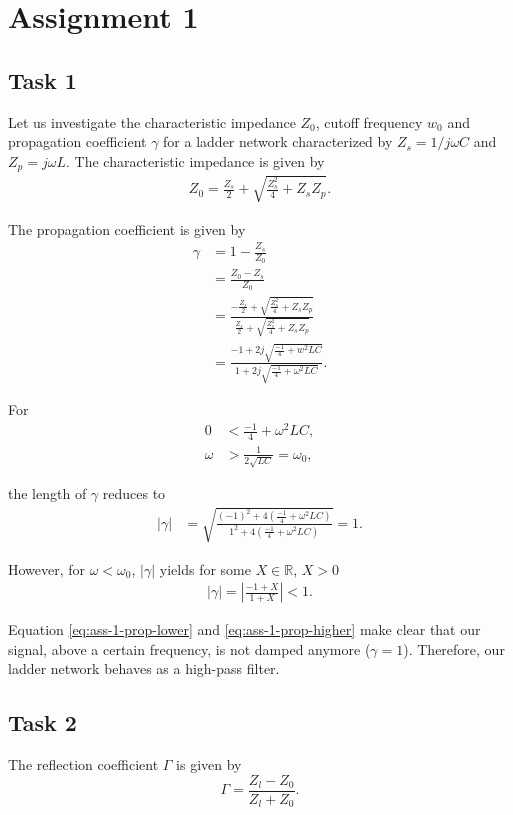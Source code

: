 \documentclass[11pt,titlepage]{report}
\begin{document}
\chapter{Assignment 1}
\section{Task 1}
Let us investigate the characteristic impedance $Z_0$, cutoff frequency $w_0$ and propagation coefficient $\gamma$ for a ladder network characterized by $Z_s=1/j \omega C$ and $Z_p=j \omega L$. The characteristic impedance is given by
\begin{align}
	Z_0 = \frac{Z_s}{2} + \sqrt{\frac{Z_s^2}{4} + Z_s Z_p}.
\end{align}

The propagation coefficient is given by
\begin{align}
	\gamma &= 1 - \frac{Z_s}{Z_0} \nonumber \\
	&= \frac{Z_0-Z_s}{Z_0} \nonumber \\
	&= \frac{-\frac{Z_s}{2} + \sqrt{\frac{Z_s^2}{4} + Z_s Z_p}}{\frac{Z_s}{2} + \sqrt{\frac{Z_s^2}{4} + Z_s Z_p}} \nonumber \\
	&= \frac{-1 + 2j\sqrt{\frac{-1}{4} + w^2 L C}}{1 + 2j\sqrt{\frac{-1}{4} + \omega{}^2 L C}}.
\end{align}

For
\begin{align}
	0 &< \frac{-1}{4} + \omega^2 L C,  \nonumber \\
	\omega &> \frac{1}{2\sqrt{LC}} = \omega_0,
\end{align}

the length of $\gamma$ reduces to
\begin{align} \label{eq:ass-1-prop-higher}
	|\gamma| &= \sqrt{\frac{(-1)^2 + 4(\frac{-1}{4}+\omega^2 L C)}{1^2 + 4(\frac{-1}{4}+\omega^2 L C)}} = 1.
\end{align}

However, for $\omega<\omega_0$, $|\gamma|$ yields for some $X \in \mathbb{R}$, $X > 0$ 
\begin{align} \label{eq:ass-1-prop-lower}
	|\gamma| = \left|\frac{-1 + X}{1 + X}\right| < 1.
\end{align}

Equation \ref{eq:ass-1-prop-lower} and \ref{eq:ass-1-prop-higher} make clear that our signal, above a certain frequency, is not damped anymore ($\gamma=1$). Therefore, our ladder network behaves as a high-pass filter.

\section{Task 2}
The reflection coefficient $\Gamma$ is given by
\begin{equation}
	\Gamma = \frac{Z_l - Z_0}{Z_l + Z_0}.
\end{equation}
\end{document}

